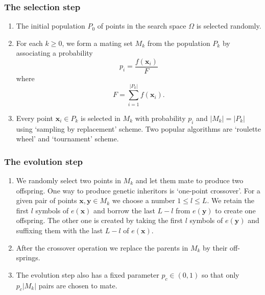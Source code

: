 \documentclass{beamer}
\begin{document}
\begin{frame}
\frametitle{The selection step}
\begin{enumerate}
\item The initial population $P_0$ of points in the search space $\Omega$ is 
selected randomly.
\item For each $k \ge 0$, we form a mating set $M_k$ from the population $P_k$
by associating a probability
\begin{equation}\label{e2}
p_i = \frac{f(\bm{x}_i)}{F}
\end{equation}
where
\begin{equation}\label{e3}
F = \sum_{i=1}^{|P_k|} f(\bm{x}_i).
\end{equation}
\item Every point $\bm{x}_i \in P_k$ is selected in $M_k$ with probability $p_i$
and $|M_k| = |P_k|$ using `sampling by replacement' scheme. Two popular 
algorithms are `roulette wheel' and `tournament' scheme.
\end{enumerate}
\end{frame}

\begin{frame}
\frametitle{The evolution step}
\begin{enumerate}
\item We randomly select two points in $M_k$ and let them mate to produce two
offspring. One way to produce genetic inheritors is `one-point crossover'. For
a given pair of points $\bm{x}, \bm{y} \in M_k$ we choose a number $1 \le l \le 
L$. We retain the first $l$ symbols of $e(\bm{x})$ and borrow the last $L-l$ 
from $e(\bm{y})$ to create one offspring. The other one is created by taking the
first $l$ symbols of $e(\bm{y})$ and suffixing them with the last $L-l$ of 
$e(\bm{x})$.
\item After the crossover operation we replace the parents in $M_k$ by their 
off-springs.
\item The evolution step also has a fixed parameter $p_c \in (0, 1)$ so that 
only $p_c|M_k|$ pairs are chosen to mate.
\end{enumerate}
\end{frame}
\end{document}
